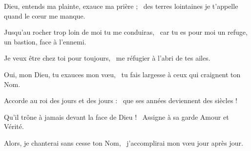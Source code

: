 \item Dieu, entends ma plainte, exauce ma prière ;~\psstar{} des terres lointaines je t'appelle quand le cœur me manque. 
\item Jusqu'au rocher trop loin de moi tu me conduiras,~\psstar{} car tu es pour moi un refuge, un bastion, face à l'ennemi.
\item Je veux être chez toi pour toujours,~\psstar{} me réfugier à l'abri de tes ailes.
\item Oui, mon Dieu, tu exauces mon vœu,~\psstar{} tu fais largesse à ceux qui craignent ton Nom.
\item Accorde au roi des jours et des jours :~\psstar{} que ses années deviennent des siècles !
\item Qu'il trône à jamais devant la face de Dieu !~\psstar{} Assigne à sa garde Amour et Vérité.
\item Alors, je chanterai sans cesse ton Nom,~\psstar{} j'accomplirai mon vœu jour après jour.
